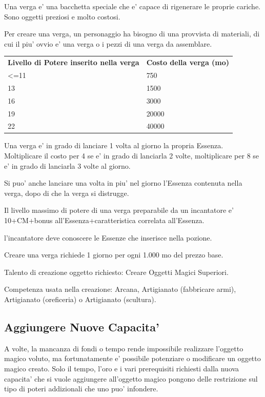 \documentclass[a4paper,11pt,twoside,openany]{book}
\begin{document}
{		Una verga e' una bacchetta speciale che e' capace di rigenerare le proprie cariche. Sono oggetti preziosi e molto costosi.
		
		Per creare una verga, un personaggio ha bisogno di una provvista di materiali, di cui il piu' ovvio e' una verga o i pezzi di una verga da assemblare.
		
		\medskip
		
		\begin{tabular}{ll}
			\toprule
			\textbf{Livello di Potere inserito nella verga} & \textbf{Costo della verga (mo)}\tabularnewline
			\textless=11 & 750\tabularnewline
			13 & 1500\tabularnewline
			16 & 3000\tabularnewline
			19 & 20000\tabularnewline
			22 & 40000\tabularnewline
		\end{tabular}
		
		\bigskip
		
		Una verga e' in grado di lanciare 1 volta al giorno la propria Essenza. Moltiplicare il costo per 4 se e' in grado di lanciarla 2 volte, moltiplicare per 8 se e' in grado di lanciarla 3 volte al giorno. 
		
		Si puo' anche lanciare una volta in piu' nel giorno l'Essenza contenuta nella verga, dopo di che la verga si distrugge.
		
		Il livello massimo di potere di una verga preparabile da un incantatore e' 10+CM+bonus all'Essenza+caratteristica correlata all'Essenza.
		
		l'incantatore deve conoscere le Essenze che inserisce nella pozione.
		
		Creare una verga richiede 1 giorno per ogni 1.000 mo del prezzo base.
		
		Talento di creazione oggetto richiesto: Creare Oggetti Magici Superiori.
		
		Competenza usata nella creazione: Arcana, Artigianato (fabbricare armi), Artigianato (oreficeria) o Artigianato (scultura).
		
		\subsection{Aggiungere Nuove Capacita'}
		
		A volte, la mancanza di fondi o tempo rende impossibile realizzare l'oggetto magico voluto, ma fortunatamente e' possibile potenziare o modificare un oggetto magico creato. Solo il tempo, l'oro e i vari prerequisiti richiesti dalla nuova capacita' che si vuole aggiungere all'oggetto magico pongono delle restrizione sul tipo di poteri addizionali che uno puo' infondere.
		
}
\end{document}
